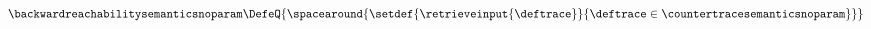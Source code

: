 \begin{align*}
  \backwardreachabilitysemanticsnoparam\DefeQ \{\spacearound{\setdef{\retrieveinput{\deftrace}}{\deftrace \in \countertracesemanticsnoparam}}\}
\end{align*}
